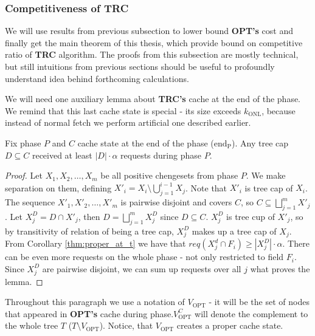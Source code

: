 \subsubsection{Competitiveness of TRC}
We will use results from previous subsection to lower bound \textbf{OPT's} cost 
and finally get the main theorem of this thesis, which provide bound on 
competitive ratio of \textbf{TRC} algorithm. The proofs from this subsection are
 mostly technical, but still intuitions from previous sections should be useful 
to profoundly understand idea behind forthcoming calculations.

We will need one auxiliary lemma about \textbf{TRC's} cache at the end of the 
phase. We remind that this last cache state is special - its size exceeds 
$k_{\mathrm{ONL}}$, because instead of normal fetch we perform artificial one 
described earlier.  
\begin{lemma}
Fix phase $P$ and $C$ cache state at the end of the phase ($\mathrm{end_P}$). 
Any tree 
cap $D \subseteq C$ received at least $|D| \cdot \alpha$ requests during phase 
$P$.
\label{thm:lots_of_req_in_tc_end_of_p}
\end{lemma}
\begin{proof}
Let $X_1, X_2, \ldots, X_m$ be all positive chengesets from phase $P$. We make 
separation on them, defining $X'_i = X_i \setminus \bigcup_{j=1}^{i-1} X_j$. 
Note 
that $X'_i$ is tree cap of $X_i$. The sequence $X'_1, X'_2, \ldots, X'_m$ is 
pairwise disjoint and covers $C$, so $C \subseteq \bigsqcup_{j=1}^m 
X'_j$. Let $X_j^D = D \cap X'_j$, then $D = \bigsqcup_{j=1}^m X_j^D$ since $D 
\subseteq C$. $X_j^D$ is tree cup of $X'_j$, so by transitivity of relation of
being a tree cap, $X_j^D$ makes up a tree cap of $X_j$. From Corollary 
\ref{thm:proper_at_t} we have that $req(X_j^d \cap F_i) \geq |X_j^D| \cdot 
\alpha$. There can be even more requests on the whole phase - not only 
restricted to 
field $F_i$. Since $X_j^D$ are pairwise disjoint, we can sum up requests over 
all $j$ what proves the lemma.
\end{proof}

Throughout this paragraph we use a notation of $V_{\mathrm{OPT}}$ - it will be 
the set of nodes 
that appeared in \textbf{OPT's} cache during phase.$V_{\mathrm{OPT}}^C$ will 
denote the complement to the whole tree $T$ ($T \setminus V_{\mathrm{OPT}}$). 
Notice, 
that $V_{\mathrm{OPT}}$ creates a proper cache state.

